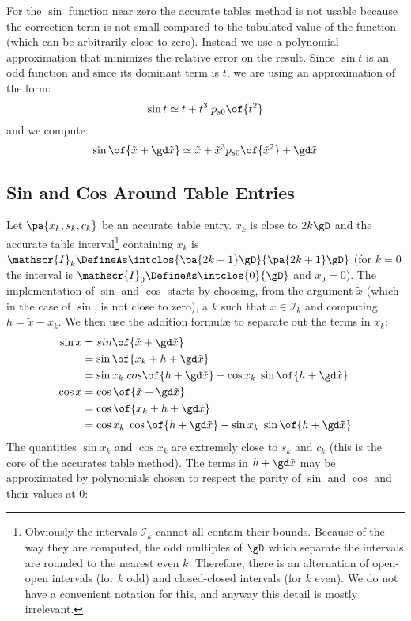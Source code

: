 \documentclass[10pt, a4paper, twoside]{basestyle}
\newcommand{\red}[1]{\tilde{#1}}
\begin{document}
For the $\sin$ function near zero the accurate tables method is not usable because the correction term is not small compared to the tabulated value of the function (which can be arbitrarily close to zero).  Instead we use a polynomial approximation that minimizes the relative error on the result.  Since $\sin t$ is an odd function and since its dominant term is $t$, we are using an approximation of the form:
\[
\sin t \simeq t + t^3 \; p_{s0}\of{t^2}
\]
and we compute:
\[
\sin\of{\red x + \gd \red x} \simeq \red x + {\red x}^3 p_{s0}\of{{\red x}^2} + \gd \red x
\]

\subsection*{Sin and Cos Around Table Entries}

Let $\pa{x_k, s_k, c_k}$ be an accurate table entry.  $x_k$ is close to $2 k \gD$ and the accurate table interval\footnote{Obviously the intervals $\mathscr{I}_k$ cannot all contain their bounds.  Because of the way they are computed, the odd multiples of $\gD$ which separate the intervals are rounded to the nearest even $k$.  Therefore, there is an alternation of open-open intervals (for $k$ odd) and closed-closed intervals (for $k$ even).  We do not have a convenient notation for this, and anyway this detail is mostly irrelevant.} containing $x_k$ is $\mathscr{I}_k \DefineAs \intclos{\pa{2 k - 1}\gD}{\pa{2 k + 1}\gD}$ (for $k = 0$ the interval is $\mathscr{I}_0 \DefineAs \intclos{0}{\gD}$ and $x_0 = 0$).  The implementation of $\sin$ and $\cos$ starts by choosing, from the argument $\red x$ (which in the case of $\sin$, is not close to zero), a $k$ such that $\red x \in \mathscr{I}_k$ and computing $h = \red x - x_k$.  We then use the addition formulæ to separate out the terms in $x_k$:
\begin{align*}
\sin x &= sin\of{\red x + \gd \red x} \\
&= \sin\of{x_k + h + \gd \red x} \\
&= \sin x_k \; cos\of{h + \gd \red x} + \cos x_k \; \sin\of{h + \gd \red x} \\
\cos x &= \cos\of{\red x + \gd \red x}  \\
&= \cos\of{x_k + h + \gd \red x} \\
&= \cos x_k \; \cos\of{h + \gd \red x} - \sin x_k \; \sin\of{h + \gd \red x}
\end{align*}
The quantities $\sin x_k$ and $\cos x_k$ are extremely close to $s_k$ and $c_k$ (this is the core of the accurates table method).  The terms in $h + \gd \red x$ may be approximated by polynomials chosen to respect the parity of $\sin$ and $\cos$ and their values at $0$:
\end{document}

